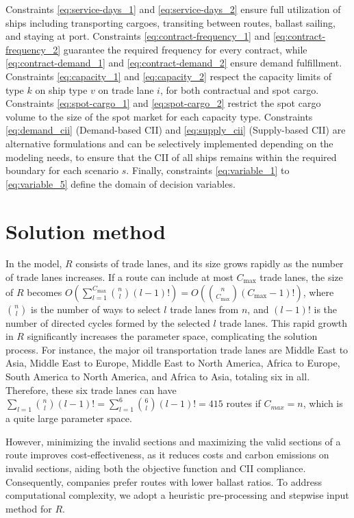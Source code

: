 \documentclass[11pt,english]{article}
\begin{document}
Constraints \eqref{eq:service-days_1} and \eqref{eq:service-days_2} ensure full utilization of ships including transporting cargoes, transiting between routes, ballast sailing, and staying at port. Constraints \eqref{eq:contract-frequency_1} and \eqref{eq:contract-frequency_2} guarantee the required frequency for every contract, while \eqref{eq:contract-demand_1} and \eqref{eq:contract-demand_2} ensure demand fulfillment. Constraints \eqref{eq:capacity_1} and \eqref{eq:capacity_2} respect the capacity limits of type $k$ on ship type $v$ on trade lane $i$, for both contractual and spot cargo. Constraints \eqref{eq:spot-cargo_1} and \eqref{eq:spot-cargo_2} restrict the spot cargo volume to the size of the spot market for each capacity type. Constraints \eqref{eq:demand_cii} (Demand-based CII) and \eqref{eq:supply_cii} (Supply-based CII) are alternative formulations and can be selectively implemented depending on the modeling needs, to ensure that the CII of all ships remains within the required boundary for each scenario $s$. Finally, constraints \eqref{eq:variable_1} to \eqref{eq:variable_5} define the domain of decision variables.

\section{Solution method}
\label{sec:algorithm}

In the model, \( R \) consists of trade lanes, and its size grows rapidly as the number of trade lanes increases. If a route can include at most \( C_{\max} \) trade lanes, the size of \( R \) becomes \( O\left(\sum_{l=1}^{C_{\max}} \binom{n}{l} (l-1)!\right) = O\left( \binom{n}{C_{\max}} (C_{\max}-1)! \right) \), where \( \binom{n}{l} \) is the number of ways to select \( l \) trade lanes from \( n \), and \( (l-1)! \) is the number of directed cycles formed by the selected \( l \) trade lanes. This rapid growth in \( R \) significantly increases the parameter space, complicating the solution process. For instance, the major oil transportation trade lanes are Middle East to Asia, Middle East to Europe, Middle East to North America, Africa to Europe, South America to North America, and Africa to Asia, totaling six in all. Therefore, these six trade lanes can have $\sum_{l=1}\binom{n}{l}(l-1)!=\sum_{l=1}^{6}\binom{6}{l}(l-1)!=415$ routes if $C_{max}=n$, which is a quite large parameter space.

However, minimizing the invalid sections and maximizing the valid sections of a route improves cost-effectiveness, as it reduces costs and carbon emissions on invalid sections, aiding both the objective function and CII compliance. Consequently, companies prefer routes with lower ballast ratios. To address computational complexity, we adopt a heuristic pre-processing and stepwise input method for \( R \).
\end{document}
